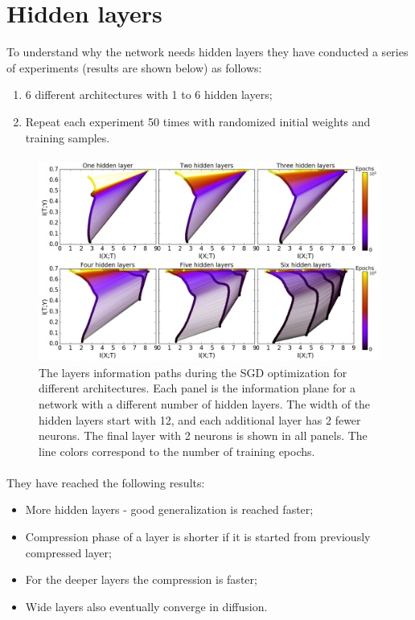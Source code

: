 \documentclass[a4paper,14pt]{extarticle}
\begin{document}
\section{Hidden layers}
To understand why the network needs hidden layers they have conducted a series of experiments (results are shown below\cite{shwartz2017opening}) as follows:
\begin{enumerate}
	\item 6 different architectures with 1 to 6 hidden layers;
	\item Repeat each experiment 50 times with randomized initial weights and training samples.
\end{enumerate}
\paragraph{}
\begin{figure}[!h]
	\centering
	\includegraphics[width=\textwidth]{../presentation/InformationPaths.png}
	\caption{The layers information paths during the SGD optimization for different architectures.
Each panel is the information plane for a network with a different number of
hidden layers. The width of the hidden layers start with 12, and each additional layer has
2 fewer neurons. The final layer with 2 neurons is shown in all panels. The line colors
correspond to the number of training epochs.}
\end{figure}
\paragraph{}
They have reached the following results:
\begin{itemize}
		\item More hidden layers - good generalization is reached faster;
		\item Compression phase of a layer is shorter if it is started from previously compressed layer;
		\item For the deeper layers the compression is faster;
		\item Wide layers also eventually converge in diffusion.
	\end{itemize}
\end{document}
